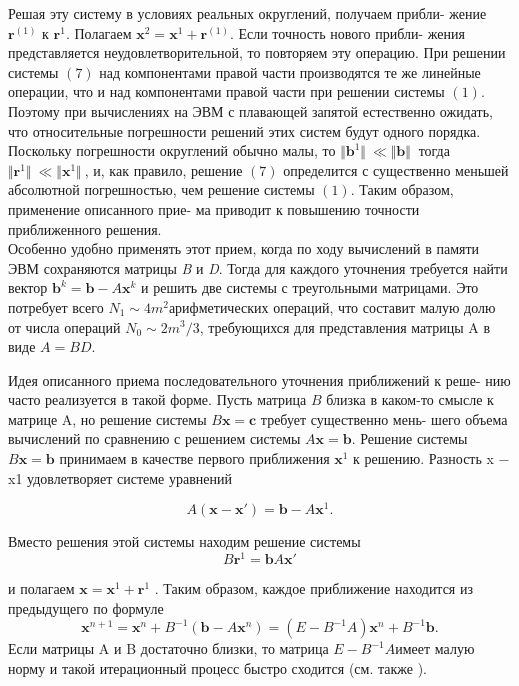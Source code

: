 \documentclass[a4paper, twoside, 12pt]{article}
\begin{document}
Решая эту систему в условиях реальных округлений, получаем прибли- жение $\textbf{r}^{(1)}$ к $\textbf{r}^{1}$. Полагаем $\textbf{x}^{2} = \textbf{x}^{1} + \textbf{r}^{(1)}$. Если точность нового прибли- жения представляется неудовлетворительной, то повторяем эту операцию. При решении системы $(7)$ над компонентами правой части производятся те же линейные операции, что и над компонентами правой части при решении системы $(1)$. Поэтому при вычислениях на ЭВМ с плавающей запятой естественно ожидать, что относительные погрешности решений этих систем будут одного порядка. Поскольку погрешности округлений обычно малы, то $ \Vert \textbf{b}^1 \Vert \ \ll  \Vert \textbf{b} \Vert \ $ тогда $ \Vert \textbf{r}^1 \Vert \ \ll  \Vert \textbf{x}^1 \Vert \ $, и, как правило, решение $(7)$ определится с существенно меньшей абсолютной погрешностью, чем решение системы $(1)$. Таким образом, применение описанного прие- ма приводит к повышению точности приближенного решения. \\ 
\indent Особенно удобно применять этот прием, когда по ходу вычислений в памяти ЭВМ сохраняются матрицы \textit{B} и \textit{D}. Тогда для каждого уточнения требуется найти вектор $\textbf{b}^k = \textbf{b} - A\textbf{x}^k$ и решить две системы с треугольными матрицами. Это потребует всего $N_{1} \sim 4m^2 $арифметических операций, что составит малую долю от числа операций $N_{0} \sim 2m^3/3$, требующихся для представления матрицы A в виде $A = BD$.
\\
\begin{adjustwidth}{1cm}{0cm}

\begin{small}
Идея описанного приема последовательного уточнения приближений к реше- нию часто реализуется в такой форме. Пусть матрица $B$ близка в каком-то
 смысле к матрице A, но решение системы $B\textbf{x} = \textbf{c}$ требует существенно мень- шего объема вычислений по сравнению с решением системы $A\textbf{x} = \textbf{b}$. Решение системы $B\textbf{x} = \textbf{b}$ принимаем в качестве первого приближения $\textbf{x}^1$ к решению. Разность x − x1 удовлетворяет системе уравнений

 \[ A(\textbf{x} - \textbf{x}') = \textbf{b} - A\textbf{x}^1.\]
 
 Вместо решения этой системы находим решение системы
  \[ B\textbf{r}^1 = \textbf{b}  A\textbf{x}'\]
  
и полагаем $\textbf{x} = \textbf{x}^1 + \textbf{r}^1$ . Таким образом, каждое приближение находится из
предыдущего по формуле
\[
\textbf{x}^{n+1} =\textbf{x}^n + B^{-1} (\textbf{b}- A\textbf{x}^n )=(E - B^{-1}A)\textbf{x}^n +B^{-1}\textbf{b}.
\]
 Если матрицы A и B достаточно близки, то матрица $
E - B^{-1}A$имеет малую норму и такой итерационный процесс быстро сходится (см. также ).
\end{small}

\end{adjustwidth}
\end{document}
